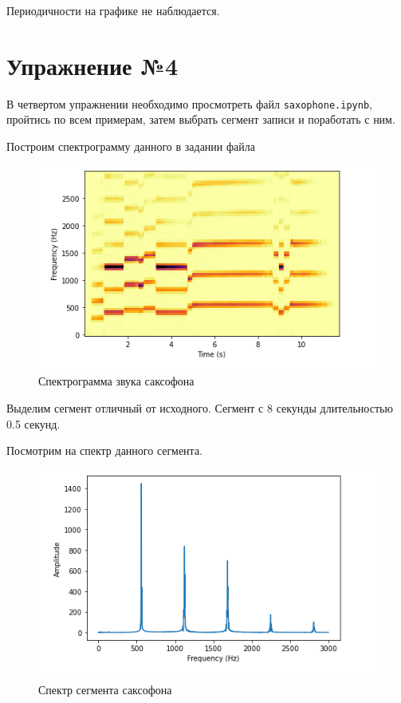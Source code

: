 \documentclass[a4paper, 14pt]{extarticle}
\begin{document}
    Периодичности на графике не наблюдается.

    \newpage


    \section{Упражнение №4}
    \label{sec:4}

    В четвертом упражнении необходимо просмотреть файл \texttt{saxophone.ipynb}, пройтись по всем примерам, затем выбрать сегмент записи и поработать с ним.

    Построим спектрограмму данного в задании файла

    \begin{figure}[H]
        \centering
        \includegraphics[width=0.8\linewidth]{sax_spectrogram}
        \caption{Спектрограмма звука саксофона}
        \label{fig:sax_spectrogram}
    \end{figure}

    Выделим сегмент отличный от исходного.
    Сегмент с 8 секунды длительностью 0.5 секунд.

    Посмотрим на спектр данного сегмента.

    \begin{figure}[H]
        \centering
        \includegraphics[width=0.8\linewidth]{sax_segment}
        \caption{Спектр сегмента саксофона}
        \label{fig:sax_segment}
    \end{figure}
\end{document}

